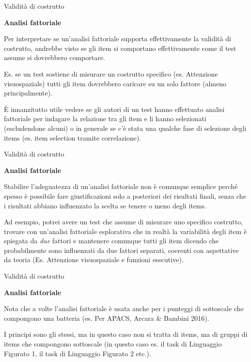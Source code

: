 \documentclass[
  ignorenonframetext,
]{beamer}
\begin{document}
\begin{frame}{Validità di costrutto}
\label{validituxe0-di-costrutto-10}
\begin{center}
  \textbf{Analisi fattoriale}
\end{center}
\vspace{1em}

Per interpretare se un'analisi fattoriale supporta effettivamente la
validità di costrutto, andrebbe visto se gli item si comportano
effettivamente come il test assume si dovrebbero comportare.

Es. se un test sostiene di misurare un costrutto specifico (es.
Attenzione visuospaziale) tutti gli item dovrebbero caricare su un solo
fattore (almeno principalmente).

È innanzitutto utile vedere se gli autori di un test hanno effettuato
analisi fattoriale per indagare la relazione tra gli item e li hanno
selezionati (escludendone alcuni) o in generale se c'è stata una qualche
fase di selezione degli items (es. item selection tramite correlazione).
\end{frame}

\begin{frame}{Validità di costrutto}
\label{validituxe0-di-costrutto-11}
\begin{center}
  \textbf{Analisi fattoriale}
\end{center}
\vspace{1em}

Stabilire l'adeguatezza di un'analisi fattoriale non è comunque semplice
perché spesso è possibile fare giustificazioni solo a posteriori dei
risultati finali, senza che i risultati abbiano influenzato la scelta se
tenere o meno degli items.

Ad esempio, potrei avere un test che assume di misurare uno specifico
costrutto, trovare con un'analisi fattoriale esplorativa che in realtà
la variabilità degli item è spiegata da \emph{due} fattori e mantenere
comunque tutti gli item dicendo che probabilmente sono influenzati da
due fattori separati, coerenti con aspettative da teoria (Es. Attenzione
visuospaziale e funzioni esecutive).
\end{frame}

\begin{frame}{Validità di costrutto}
\label{validituxe0-di-costrutto-12}
\begin{center}
  \textbf{Analisi fattoriale}
\end{center}
\vspace{2em}

Nota che a volte l'analisi fattoriale è usata anche per i punteggi di
sottoscale che compongono una batteria (es. Per APACS, Arcara \& Bambini
2016).

I principi sono gli stessi, ma in questo caso non si tratta di items, ma
di gruppi di items che compongono sottoscale (in questo caso es. il task
di Linguaggio Figurato 1, il task di Linguaggio Figurato 2 etc.).
\end{frame}
\end{document}
